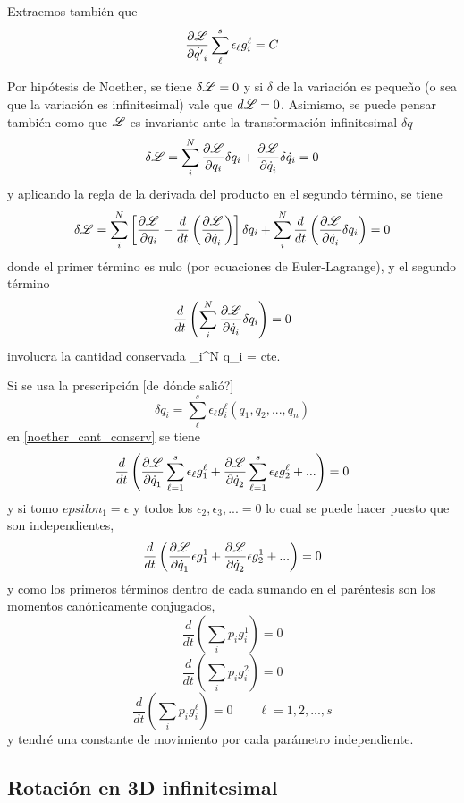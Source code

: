 \documentclass[10pt,oneside]{CBFT_book}
\begin{document}
Extraemos también que 
\[
	\frac{\partial^{\hspace{-0.05em}} {\mathscr{L}}}{\partial {\dot{q'}_i}^{\hspace{-0.05em}}} \sum_\ell^s \epsilon_\ell g_i^\ell = C
\]

Por hipótesis de Noether, se tiene $\delta \mathscr{L} = 0$ y si $\delta$ de la variación es pequeño (o sea que la variación 
es infinitesimal) vale que $d\mathscr{L} = 0$. Asimismo, se puede pensar también como que $\mathscr{L}$ es invariante ante la 
transformación infinitesimal $\delta q$
\[
	\delta\mathscr{L} = \sum_i^N \frac{\partial^{\hspace{-0.05em}} {\mathscr{L}}}{\partial {q_i}^{\hspace{-0.05em}}}\delta q_i + \frac{\partial^{\hspace{-0.05em}} {\mathscr{L}}}{\partial {\dot{q}_i}^{\hspace{-0.05em}}}\delta \dot{q}_i = 0
\]
y aplicando la regla de la derivada del producto en el segundo término, se tiene
\[
	\delta\mathscr{L} = \sum_i^N \left[ \frac{\partial^{\hspace{-0.05em}} {\mathscr{L}}}{\partial {q_i}^{\hspace{-0.05em}}} - \frac{d}{dt}\left( \frac{\partial^{\hspace{-0.05em}} {\mathscr{L}}}{\partial {\dot{q}_i}^{\hspace{-0.05em}}} \right)
	\right]\delta q_i  + \sum_i^N \frac{d}{dt}\left( \frac{\partial^{\hspace{-0.05em}} {\mathscr{L}}}{\partial {\dot{q}_i}^{\hspace{-0.05em}}} \delta q_i \right)  = 0 
\]
donde el primer término es nulo (por ecuaciones de Euler-Lagrange), y el segundo término 
\[
	\frac{d}{dt} \left( \sum_i^N \frac{\partial^{\hspace{-0.05em}} {\mathscr{L}}}{\partial {\dot{q}_i}^{\hspace{-0.05em}}} \delta q_i \right)  = 0
\]
involucra la cantidad conservada
\be
	\sum_i^N  \delta q_i = cte.
	\label{noether_cant_conserv}
\ee

Si se usa la prescripción [de dónde salió?]
\[
	\delta q_i =  \sum_\ell^s \epsilon_\ell g_i^\ell(q_1,q_2,...,q_n)
\]
en \eqref{noether_cant_conserv} se tiene 
\[
	\frac{d}{dt} \left( \frac{\partial^{\hspace{-0.05em}} {\mathscr{L}}}{\partial {\dot{q}_1}^{\hspace{-0.05em}}} \sum_{\ell=1}^s \epsilon_\ell g_1^\ell  + 
	\frac{\partial^{\hspace{-0.05em}} {\mathscr{L}}}{\partial {\dot{q}_2}^{\hspace{-0.05em}}} \sum_{\ell=1}^s \epsilon_\ell g_2^\ell + ...	
	\right)  = 0
\]
y si tomo $epsilon_1 =\epsilon$ y todos los $\epsilon_2,\epsilon_3,...=0$ lo cual se puede hacer puesto que son 
independientes,
\[
	\frac{d}{dt} \left( \frac{\partial^{\hspace{-0.05em}} {\mathscr{L}}}{\partial {\dot{q}_1}^{\hspace{-0.05em}}} \epsilon g_1^1  + 
	\frac{\partial^{\hspace{-0.05em}} {\mathscr{L}}}{\partial {\dot{q}_2}^{\hspace{-0.05em}}} \epsilon g_2^1 + ...	\right)  = 0
\]
y como los primeros términos dentro de cada sumando en el paréntesis son los momentos canónicamente conjugados,
\[
	\frac{d}{dt} \left( \sum_i p_i g_i^1 \right)  = 0
\]
\[
	\frac{d}{dt} \left( \sum_i p_i g_i^2 \right)  = 0
\]
\[
	\frac{d}{dt} \left( \sum_i p_i g_i^\ell \right)  = 0 \qquad \ell =1,2,...,s
\]
y tendré una constante de movimiento por cada parámetro independiente.

\subsection{Rotación en 3D infinitesimal}
\end{document}
